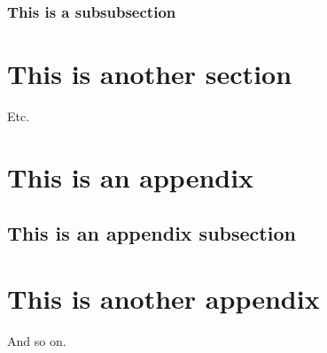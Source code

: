 \documentclass[12pt]{article}
\begin{document}
  \subsubsection{This is a subsubsection}

  \clearpage
  \section{This is another section}
  Etc.


  \cleardoublepage
  \phantom{text}
  \begin{appendices}
    \clearpage
    \section{This is an appendix}
    
    \subsection{This is an appendix subsection}

    \clearpage
    \section{This is another appendix}
    And so on.
  \end{appendices}

  \clearpage
  
  
\end{document}
